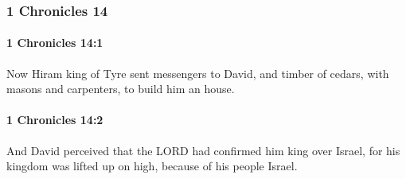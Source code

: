 	\subsubsection{1 Chronicles 14} %
		\label{1CHRONICLES-14}

		\paragraph{1 Chronicles 14:1} %
			\label{1CHRONICLES-14-1}

			Now Hiram king of Tyre sent messengers to David, and timber of cedars, with masons and carpenters, to build him an house.


		\paragraph{1 Chronicles 14:2} %
			\label{1CHRONICLES-14-2}

			And David perceived that the LORD had confirmed him king over Israel, for his kingdom was lifted up on high, because of his people Israel.

